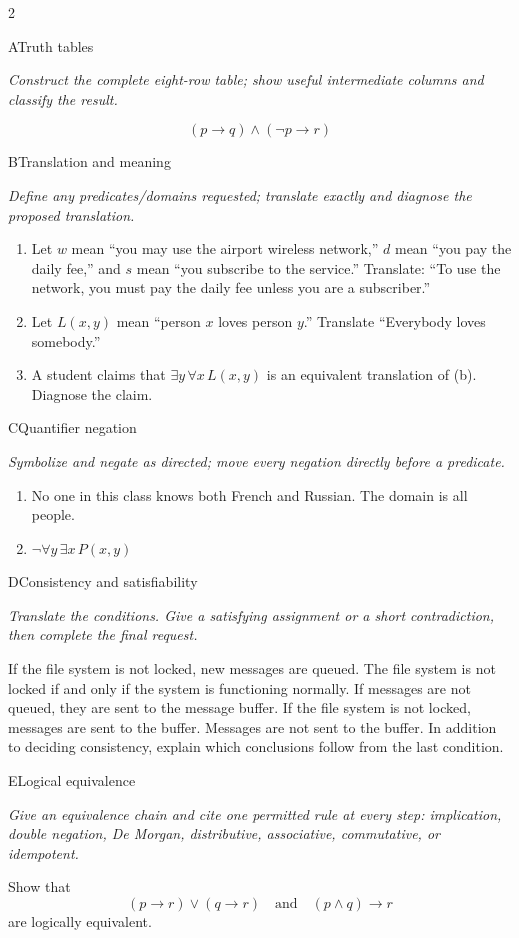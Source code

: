 \documentclass[9pt]{extarticle}
\begin{document}
\begin{multicols}{2}
\begin{CoreProblem}{A}{Truth tables}
{\scriptsize\textit{Construct the complete eight-row table; show useful intermediate columns and classify the result.}\par}
\[
  (p\to q)\land(\neg p\to r)
\]
\end{CoreProblem}
\begin{CoreProblem}{B}{Translation and meaning}
{\scriptsize\textit{Define any predicates/domains requested; translate exactly and diagnose the proposed translation.}\par}
\begin{enumerate}[label=(\alph*)]
  \item Let $w$ mean ``you may use the airport wireless network,'' $d$ mean
        ``you pay the daily fee,'' and $s$ mean ``you subscribe to the
        service.'' Translate: ``To use the network, you must pay the daily fee
        unless you are a subscriber.''
  \item Let $L(x,y)$ mean ``person $x$ loves person $y$.'' Translate
        ``Everybody loves somebody.''
  \item A student claims that $\exists y\,\forall x\,L(x,y)$ is an equivalent
        translation of (b). Diagnose the claim.
\end{enumerate}
\end{CoreProblem}
\begin{CoreProblem}{C}{Quantifier negation}
{\scriptsize\textit{Symbolize and negate as directed; move every negation directly before a predicate.}\par}
\begin{enumerate}[label=(\alph*)]
  \item No one in this class knows both French and Russian. The domain is all
        people.
  \item $\neg\forall y\,\exists x\,P(x,y)$
\end{enumerate}
\end{CoreProblem}
\columnbreak
\begin{CoreProblem}{D}{Consistency and satisfiability}
{\scriptsize\textit{Translate the conditions. Give a satisfying assignment or a short contradiction, then complete the final request.}\par}
If the file system is not locked, new messages are queued. The file system is
not locked if and only if the system is functioning normally. If messages are
not queued, they are sent to the message buffer. If the file system is not
locked, messages are sent to the buffer. Messages are not sent to the buffer.
In addition to deciding consistency, explain which conclusions follow from the
last condition.
\end{CoreProblem}
\begin{CoreProblem}{E}{Logical equivalence}
{\scriptsize\textit{Give an equivalence chain and cite one permitted rule at every step: implication, double negation, De Morgan, distributive, associative, commutative, or idempotent.}\par}
Show that
\[
  (p\to r)\lor(q\to r)
  \quad\text{and}\quad
  (p\land q)\to r
\]
are logically equivalent.
\end{CoreProblem}
\end{multicols}
\end{document}
